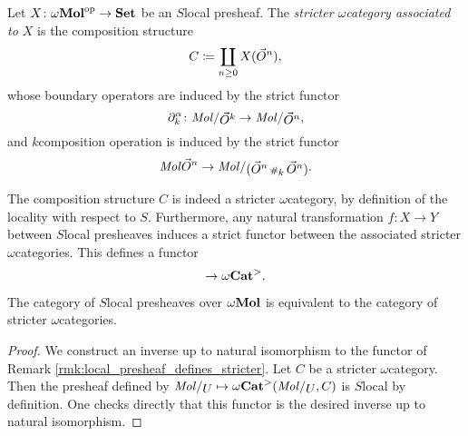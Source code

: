 \begin{dfn}
    Let \( X \colon \omega\mathbf{Mol}^\mathrm{op} \to \mathbf{Set} \) be an \( S \)\nbd local presheaf.
    The \emph{stricter \( \omega \)\nbd category associated to \( X \)} is the composition structure 
    \begin{equation*}
        C \coloneqq \coprod_{n \geq 0} X(\vec{O}^{n}),
    \end{equation*}
    whose boundary operators are induced by the strict functor
    \begin{equation*}
        \bd{k}{\a} \colon \molecin{\dglobe{k}} \to \molecin{\dglobe{n}}, 
    \end{equation*}
    and \( k \)\nbd composition operation is induced by the strict functor
    \begin{equation*}
        \molec{\dglobe{n}} \to \molecin{(\dglobe{n} \cp{k} \dglobe{n})}.
    \end{equation*}
\end{dfn}

\begin{rmk}\label{rmk:local_presheaf_defines_stricter}
    The composition structure \( C \) is indeed a stricter \( \omega \)\nbd category, by definition of the locality with respect to \( S \).
    Furthermore, any natural transformation \( f \colon X \to Y \) between \( S \)\nbd local presheaves induces a strict functor between the associated stricter \( \omega \)\nbd categories.
    This defines a functor
    \begin{equation*}
        [\opp{\omegaMol}, \Set] \to \somegaCat.
    \end{equation*}
\end{rmk}

\begin{prop} \label{prop:stricter_cat_are_local_presheaves}
    The category of \( S \)\nbd local presheaves over \( \omega\mathbf{Mol} \) is equivalent to the category of stricter \( \omega \)\nbd categories.
\end{prop}
\begin{proof}
    We construct an inverse up to natural isomorphism to the functor of Remark \ref{rmk:local_presheaf_defines_stricter}.
    Let \( C \) be a stricter \( \omega \)\nbd category.
    Then the presheaf defined by \(\molecin{U} \mapsto \somegaCat(\molecin{U}, C) \) is \( S \)\nbd local by definition. 
    One checks directly that this functor is the desired inverse up to natural isomorphism.
\end{proof}


